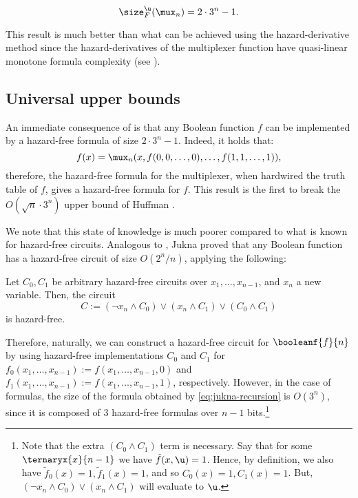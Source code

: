 \documentclass[acmsmall, nonacm, authorversion]{acmart}
\begin{document}
\begin{theorem}\label{thm:mux-exact-bound}
\[
\size^\u_F(\mux_n)=2\cdot 3^n-1.
\]
\end{theorem}
This result is much better than what can be achieved using the hazard-derivative method since the hazard-derivatives of the multiplexer function have quasi-linear monotone formula complexity (see \cite[Proposition 1]{IK23}). 

\subsection{Universal upper bounds}
An immediate consequence of  is that any Boolean function $f$ can be implemented by a hazard-free formula of size $2\cdot 3^n-1$. Indeed, it holds that:
\[
f(x) = \mux_n(x, f(0,0,\ldots,0), \ldots,f(1,1,\ldots,1)),
\] 
therefore, the hazard-free formula for the multiplexer, when hardwired the truth table of $f$, gives a hazard-free formula for $f$. This result is the first to break the  $O(\sqrt{n}\cdot 3^n)$  upper bound of Huffman \cite{Huf57}. 

We note that this state of knowledge is much poorer compared to what is known for hazard-free circuits. Analogous to \cite{Sha49, Mul56}, Jukna \cite[Section 7]{Juk21} proved that any Boolean function has a hazard-free circuit of size $O(2^n/n)$, applying the following:
\begin{proposition}\label{prop:hazard-free-consensus-construction}
Let $C_0, C_1$ be arbitrary hazard-free circuits over $x_1,\dots,x_{n-1}$, and $x_n$ a new variable. Then, the circuit
\begin{equation}\label{eq:jukna-recursion}
    C := (\neg x_n\land C_0) \lor (x_n\land C_1) \lor (C_0 \land C_1)
\end{equation}
is hazard-free.
\end{proposition}
Therefore, naturally, we can construct a hazard-free circuit for $\booleanf{f}{n}$ by using hazard-free implementations $C_0$ and $C_1$ for $f_0(x_1,\dots,x_{n-1}):= f(x_1,\dots,x_{n-1}, 0)$ and $f_1(x_1,\dots,x_{n-1}):= f(x_1,\dots,x_{n-1}, 1)$, respectively. However, in the case of formulas, the size of the formula obtained by \eqref{eq:jukna-recursion} is $O(3^n)$, since it is composed of 3 hazard-free formulas over $n-1$ bits.\footnote{Note that the extra $(C_0 \land C_1)$ term is necessary. Say that for some $\ternaryx{x}{n-1}$ we have $\tilde{f}(x,\u)=1$. Hence, by definition, we also have $\tilde{f}_0(x)=1,\tilde{f}_1(x)=1$, and so $C_0(x)=1,C_1(x)=1$. But, $(\neg x_n\land C_0) \lor (x_n\land C_1)$ will evaluate to $\u$.}
\end{document}
